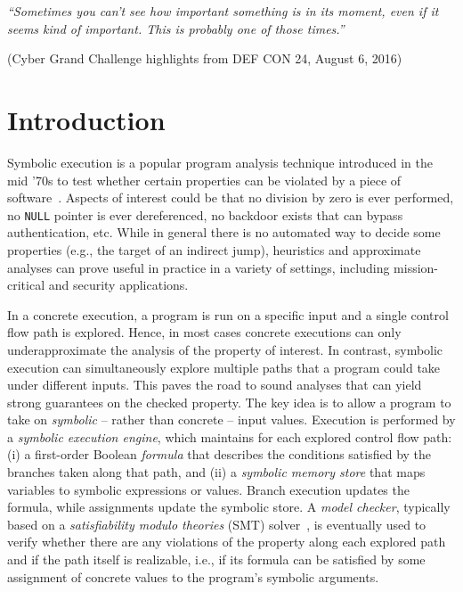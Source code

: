 
\epigraph{\textit{``Sometimes you can't see how important something is in its moment, even if it seems kind of important. This is probably one of those times.''}}{(Cyber Grand Challenge highlights from DEF CON 24, August 6, 2016)}

\vspace{-2.5mm}
\section{Introduction}
\label{se:intro}

Symbolic execution is a popular program analysis technique introduced in the mid '70s to test whether certain properties can be violated by a piece of software~\cite{K-ICRS75,SELECT-ICRS75,K-CACM76,H-TSE77}. Aspects of interest could be that no division by zero is ever performed, no {\tt NULL} pointer is ever dereferenced, no backdoor exists that can bypass authentication, etc. While in general there is no automated way to decide some properties (e.g., the target of an indirect jump), heuristics and approximate analyses can prove useful in practice in a variety of settings, including mission-critical and security applications.


In a concrete execution, a program is run on a specific input and a single control flow path is explored. Hence, in most cases concrete executions can only underapproximate the analysis of the property of interest. In contrast, symbolic execution can simultaneously explore multiple paths that a program could take under different inputs. This paves the road to sound analyses that can yield strong guarantees on the checked property. 
The key idea is to allow a program to take on {\em symbolic} -- rather than concrete -- input values. Execution is performed by a {\em symbolic execution engine}, which maintains for each explored control flow path: (i) a first-order Boolean {\em formula} that describes the conditions satisfied by the branches taken along that path, and (ii) a {\em symbolic memory store} that maps variables to symbolic expressions or values. Branch execution updates the formula, while assignments update the symbolic store. A {\em model checker}, typically based on a {\em satisfiability modulo theories} (SMT) solver~\cite{HandbookOfSAT2009}, is eventually used to verify whether there are any violations of the property along each explored path and if the path itself is realizable, i.e., if its formula can be satisfied by some assignment of concrete values to the program's symbolic arguments.


